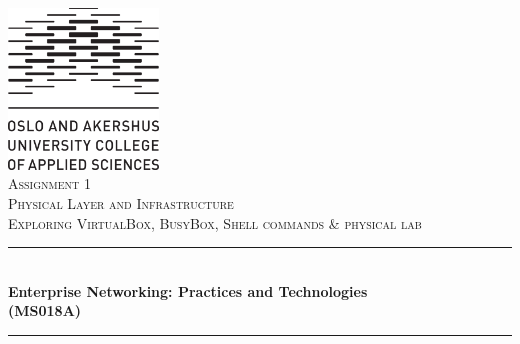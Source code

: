 \documentclass[12pt]{article}
\begin{document}
\begin{titlepage}

\newcommand{\HRule}{\rule{\linewidth}{0.5mm}} %

\center %
 


\includegraphics[width=0.3\textwidth]{hioa-logo-middels-org-eng.png}\\[1cm] %

\textsc{\LARGE Assignment 1 }\\[0.3cm] %
\textsc{\Large Physical Layer and Infrastructure }\\[0.3cm]
\textsc{ Exploring VirtualBox, BusyBox, Shell commands \& physical lab }\\[0.5cm] %


\HRule \\[0.4cm]
{ \huge \bfseries Enterprise Networking: Practices and Technologies \\(MS018A) }\\[0.03cm] %
\HRule \\[1.5cm]

 


\end{titlepage}
\end{document}
